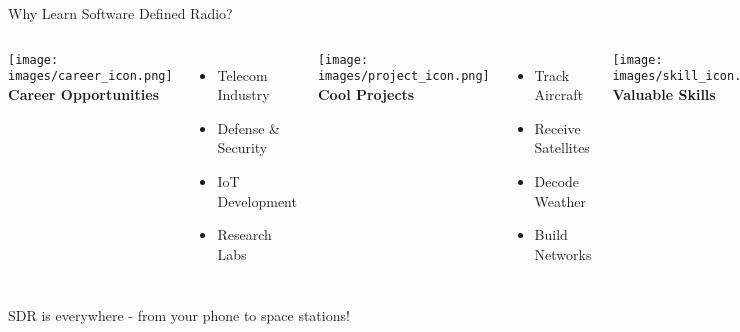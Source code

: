 \documentclass[aspectratio=169,11pt]{beamer}
\begin{document}
\begin{frame}{Why Learn Software Defined Radio?}
\begin{columns}[T]
\begin{center}
\texttt{[image: images/career\_icon.png]}
\textbf{Career Opportunities}
\end{center}
\begin{itemize}
    \item Telecom Industry
    \item Defense \& Security
    \item IoT Development
    \item Research Labs
\end{itemize}

\begin{center}
\texttt{[image: images/project\_icon.png]}
\textbf{Cool Projects}
\end{center}
\begin{itemize}
    \item Track Aircraft
    \item Receive Satellites
    \item Decode Weather
    \item Build Networks
\end{itemize}

\begin{center}
\texttt{[image: images/skill\_icon.png]}
\textbf{Valuable Skills}
\end{center}
\begin{itemize}
    \item Signal Processing
    \item Programming
    \item Problem Solving
    \item System Design
\end{itemize}
\end{columns}
\vspace{1em}
\begin{center}
\Large\textcolor{radioblue}{SDR is everywhere - from your phone to space stations!}
\end{center}
\end{frame}
\end{document}

